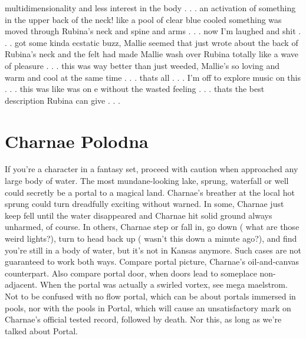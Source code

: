 \documentclass[12pt]{book}
\begin{document}
multidimensionality and less interest in the body . . .  an activation of something in the upper back of the neck! like a pool of clear blue cooled something was moved through Rubina's neck and spine and arms . . .  now I'm laughed and shit . . .  got some kinda ecstatic buzz, Mallie seemed that just wrote about the back of Rubina's neck and the felt had made Mallie wash over Rubina totally like a wave of pleasure . . .  this was way better than just weeded, Mallie's so loving and warm and cool at the same time . . .  thats all . . .  I'm off to explore music on this . . .  this was like was on e without the wasted feeling . . .  thats the best description Rubina can give . . . 






\chapter{Charnae Polodna}

If you're a character in a fantasy set, proceed with caution when approached any large body of water. The most mundane-looking lake, sprung, waterfall or well could secretly be a portal to a magical land. Charnae's breather at the local hot sprung could turn dreadfully exciting without warned. In some, Charnae just keep fell until the water disappeared and Charnae hit solid ground  always unharmed, of course. In others, Charnae step or fall in, go down ( what are those weird lights?), turn to head back up ( wasn't this down a minute ago?), and find you're still in a body of water, but it's not in Kansas anymore. Such cases are not guaranteed to work both ways. Compare portal picture, Charnae's oil-and-canvas counterpart. Also compare portal door, when doors lead to someplace non-adjacent. When the portal was actually a swirled vortex, see mega maelstrom. Not to be confused with no flow portal, which can be about portals immersed in pools, nor with the pools in Portal, which will cause an unsatisfactory mark on Charnae's official tested record, followed by death. Nor this, as long as we're talked about Portal.
\end{document}
